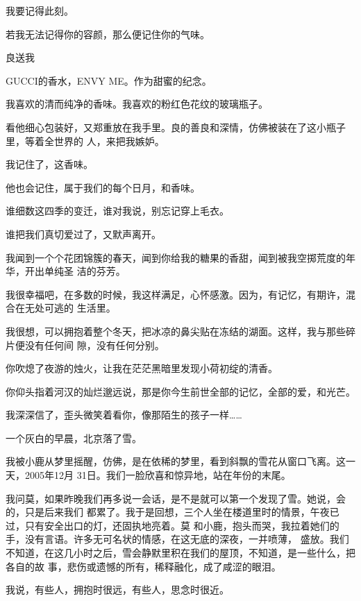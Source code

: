 		我要记得此刻。

		若我无法记得你的容颜，那么便记住你的气味。

		良送我

		GUCCI的香水，ENVY ME。作为甜蜜的纪念。\par
		我喜欢的清而纯净的香味。我喜欢的粉红色花纹的玻璃瓶子。

		看他细心包装好，又郑重放在我手里。良的善良和深情，仿佛被装在了这小瓶子里，等着全世界的
	人，来把我嫉妒。

		我记住了，这香味。\par
		他也会记住，属于我们的每个日月，和香味。\par
		谁细数这四季的变迁，谁对我说，别忘记穿上毛衣。\par
		谁把我们真切爱过了，又默声离开。

		\vspace{1em}
		我闻到一个个花团锦簇的春天，闻到你给我的糖果的香甜，闻到被我空掷荒度的年华，开出单纯圣
	洁的芬芳。

		我很幸福吧，在多数的时候，我这样满足，心怀感激。因为，有记忆，有期许，混合在无处可逃的
	生活里。

		我很想，可以拥抱着整个冬天，把冰凉的鼻尖贴在冻结的湖面。这样，我与那些碎片便没有任何间
	隙，没有任何分别。

		\vspace{1em}
		你吹熄了夜游的烛火，让我在茫茫黑暗里发现小荷初绽的清香。\par
		你仰头指着河汉的灿烂邈远说，那是你今生前世全部的记忆，全部的爱，和光芒。\par
		我深深信了，歪头微笑着看你，像那陌生的孩子一样……

	\endwriting



		一个灰白的早晨，北京落了雪。

		我被小鹿从梦里摇醒，仿佛，是在依稀的梦里，看到斜飘的雪花从窗口飞离。这一天，2005年12月
	31日。我们一脸欣喜和惊异地，站在年份的末尾。


		我问莫，如果昨晚我们再多说一会话，是不是就可以第一个发现了雪。她说，会的，只是后来我们
	都累了。我于是回想，三个人坐在楼道里时的情景，午夜已过，只有安全出口的灯，还固执地亮着。莫
	和小鹿，抱头而哭，我拉着她们的手，没有言语。许多无可名状的情感，在这无底的深夜，一并喷薄，
	盛放。我们不知道，在这几小时之后，雪会静默里积在我们的屋顶，不知道，是一些什么，把各自的故
	事，悲伤或遗憾的所有，稀释融化，成了咸涩的眼泪。


		我说，有些人，拥抱时很远，有些人，思念时很近。

